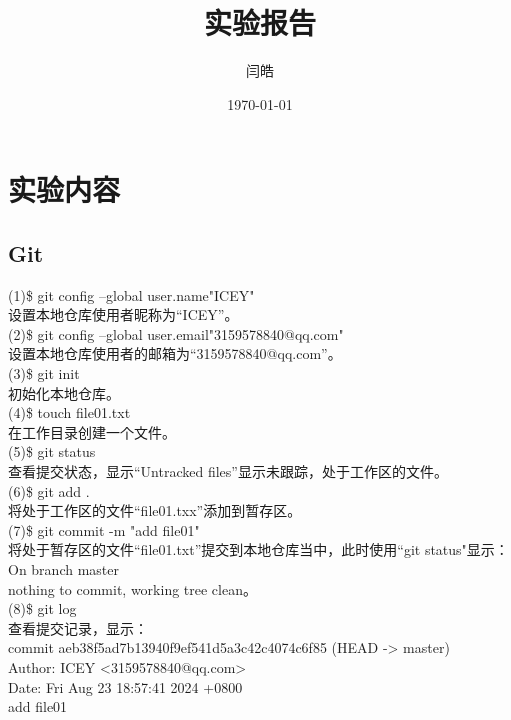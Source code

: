 \documentclass[a4paper, 12pt]{article}
\begin{document}
 \title{实验报告}
 \author{闫皓}
 \date{\today}
 \maketitle

\tableofcontents
\newpage
{}

  \section{实验内容}
    \subsection{Git}
\noindent(1){\color{blue}\$ git config --global user.name"ICEY"}\\
设置本地仓库使用者昵称为“ICEY”。\\

\noindent(2){\color{blue}\$ git config --global user.email"3159578840@qq.com"}\\
设置本地仓库使用者的邮箱为“3159578840@qq.com”。\\

\noindent(3){\color{blue}\$ git init}\\
初始化本地仓库。\\

\noindent(4){\color{blue}\$ touch file01.txt}\\
在工作目录创建一个文件。\\

\noindent(5){\color{blue}\$ git status}\\
查看提交状态，显示“Untracked files”显示未跟踪，处于工作区的文件。\\

\noindent(6){\color{blue}\$ git add .}\\
将处于工作区的文件“file01.txx”添加到暂存区。\\

\noindent(7){\color{blue}\$ git commit -m "add file01"}\\
将处于暂存区的文件“file01.txt”提交到本地仓库当中，此时使用“git status"显示：\\
On branch master\\
nothing to commit, working tree clean。\\

\noindent(8){\color{blue}\$ git log}\\
查看提交记录，显示：\\
commit aeb38f5ad7b13940f9ef541d5a3c42c4074c6f85 (HEAD -> master)\\
Author: ICEY <3159578840@qq.com>\\
Date:   Fri Aug 23 18:57:41 2024 +0800\\
    add file01\\
\end{document}
